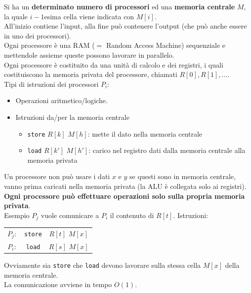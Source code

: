 \documentclass[11pt]{article}
\begin{document}
	Si ha un \textbf{determinato numero di processori} ed una \textbf{memoria centrale} $M$, la quale $i-1$esima cella viene indicata con $M[i]$.\\
	All'inizio contiene l'input, alla fine può contenere l'output (che può anche essere in uno dei processori).\\
	
	Ogni processore è una RAM ($=$ Random Access Machine) sequenziale e mettendole assieme queste possono lavorare in parallelo.\\
	Ogni processore è costituito da una unità di calcolo e dei registri, i quali costituiscono la memoria privata del processore, chiamati $R[0], R[1], ...$.\\
	
	Tipi di istruzioni dei processori $P_i$:
	\begin{itemize}
		\item Operazioni aritmetico/logiche.\\
		
		\item Istruzioni da/per la memoria centrale
		\begin{itemize}
			\item  \texttt{store} $R[k]$ $M[h]$: mette il dato nella memoria centrale 
			\item \texttt{load} $R[k']$ $M[h']$: carico nel registro dati dalla memoria centrale alla memoria privata
		\end{itemize}
	\end{itemize}
	Un processore non può usare i dati $x$ e $y$ se questi sono in memoria centrale, vanno prima caricati nella memoria privata (la ALU è collegata solo ai registri). \textbf{Ogni processore può effettuare operazioni solo sulla propria memoria privata}.\\
	
	Esempio $P_j$ vuole comunicare a $P_i$ il contenuto di $R[t]$. Istruzioni: 
	\begin{center}
		\begin{tabular}{c c c}
			$P_j:$ & \texttt{store} & $R[t]$ $M[x]$ \\
			$P_i:$ & \texttt{load} & $R[s]$ $M[x]$
		\end{tabular}
	\end{center}
	Ovviamente sia \texttt{store} che \texttt{load} devono lavorare sulla stessa cella $M[x]$ della memoria centrale. \\
	
	La comunicazione avviene in tempo $O(1)$.\\
	
\end{document}
